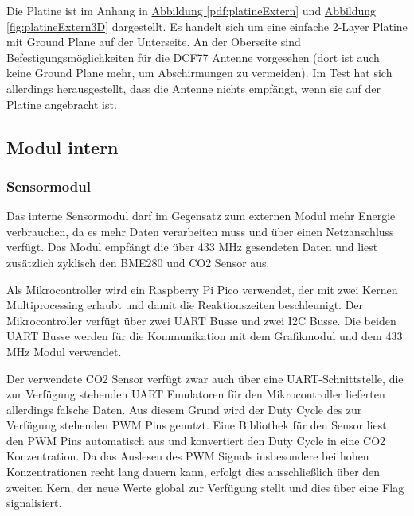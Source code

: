 \documentclass[a4paper,11pt]{article}
\newcounter{subsubsubsection}[subsubsection]
\begin{document}
\label{subsubsubsub:platineExtern}

Die Platine ist im Anhang in \hyperref[pdf:platineExtern]{Abbildung \ref{pdf:platineExtern}} und \hyperref[fig:platineExtern3D]{Abbildung \ref{fig:platineExtern3D}} dargestellt. Es handelt sich um eine einfache 2-Layer Platine mit Ground Plane
auf der Unterseite. An der Oberseite sind Befestigungsmöglichkeiten für die DCF77 Antenne vorgesehen (dort ist auch keine Ground Plane mehr, um Abschirmungen zu vermeiden). 
Im Test hat sich allerdings herausgestellt, dass die Antenne nichts empfängt, wenn sie auf der Platine angebracht ist. 

\newpage
\subsection{Modul intern}
\label{subsub:modulInt}

\subsubsection{Sensormodul}
\label{subsubsub:sensormodulInt}

Das interne Sensormodul darf im Gegensatz zum externen Modul mehr Energie verbrauchen, da es mehr Daten verarbeiten muss und über einen Netzanschluss verfügt. 
Das Modul empfängt die über 433 MHz gesendeten Daten und liest zusätzlich zyklisch den BME280 und CO2 Sensor aus.

\vspace{0.3cm}
\noindent
Als Mikrocontroller wird ein Raspberry Pi Pico verwendet, der mit zwei Kernen Multiprocessing erlaubt und damit die Reaktionszeiten beschleunigt. Der Mikrocontroller
verfügt über zwei UART Busse und zwei I2C Busse. Die beiden UART Busse werden für die Kommunikation mit dem Grafikmodul und dem 433 MHz Modul verwendet.

\noindent
Der verwendete CO2 Sensor verfügt zwar auch über eine UART-Schnittstelle, die zur Verfügung stehenden UART Emulatoren für den Mikrocontroller lieferten allerdings
falsche Daten. Aus diesem Grund wird der Duty Cycle des zur Verfügung stehenden PWM Pins genutzt. 
Eine Bibliothek für den Sensor liest den PWM Pins automatisch aus und konvertiert den Duty Cycle in eine CO2 Konzentration. Da das Auslesen des PWM Signals insbesondere bei hohen
Konzentrationen recht lang dauern kann, erfolgt dies ausschließlich über den zweiten Kern, der neue Werte global zur Verfügung stellt und dies über eine Flag signalisiert. 
\end{document}
